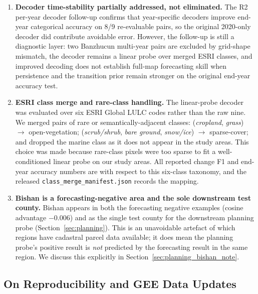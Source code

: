 \documentclass{article}
\begin{document}
\begin{enumerate}
\item \label{lim:decoder_stability} \textbf{Decoder time-stability partially addressed, not eliminated.} The R2 per-year decoder follow-up confirms that year-specific decoders improve end-year categorical accuracy on 8/9 re-evaluable pairs, so the original 2020-only decoder did contribute avoidable error. However, the follow-up is still a diagnostic layer: two Banzhucun multi-year pairs are excluded by grid-shape mismatch, the decoder remains a linear probe over merged ESRI classes, and improved decoding does not establish full-map forecasting skill when persistence and the transition prior remain stronger on the original end-year accuracy test.

\item \label{lim:esri_classes} \textbf{ESRI class merge and rare-class handling.} The linear-probe decoder was evaluated over six ESRI Global LULC codes rather than the raw nine. We merged pairs of rare or semantically-adjacent classes: (\emph{cropland}, \emph{grass}) $\to$ open-vegetation; (\emph{scrub/shrub}, \emph{bare ground}, \emph{snow/ice}) $\to$ sparse-cover; and dropped the marine class as it does not appear in the study areas. This choice was made because rare-class pixels were too sparse to fit a well-conditioned linear probe on our study areas. All reported change F1 and end-year accuracy numbers are with respect to this six-class taxonomy, and the released \texttt{class\_merge\_manifest.json} records the mapping.

\item \label{lim:bishan_role} \textbf{Bishan is a forecasting-negative area and the sole downstream test county.} Bishan appears in both the forecasting negative examples (cosine advantage $-0.006$) and as the single test county for the downstream planning probe (Section~\ref{sec:planning}). This is an unavoidable artefact of which regions have cadastral parcel data available; it does mean the planning probe's positive result is \emph{not} predicted by the forecasting result in the same region. We discuss this explicitly in Section~\ref{sec:planning_bishan_note}.
\end{enumerate}

\subsection{On Reproducibility and GEE Data Updates}
\label{sec:reproducibility_discussion}
\end{document}

